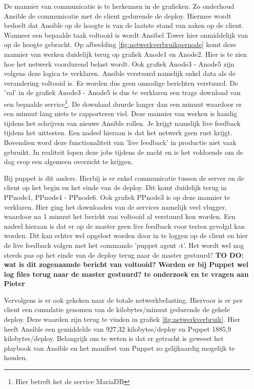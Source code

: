 De mannier van communicatie is te herkennen in de grafieken. Zo onderhoud Ansible de communicatie met de client gedurende de deploy. Hiermee wordt bedoelt dat Ansible op de hoogte is van de laatste stand van zaken op de client. Wanneer een bepaalde taak voltooid is wordt Ansibel Tower hier onmiddelijk van op de hoogte gebracht. Op afbeelding \ref{fig:netwerkverbruikpernode} komt deze mannier van werken duidelijk terug op grafiek Anode1 en Anode2. Hier is te zien hoe het netwerk voordurend belast wordt. Ook grafiek Anode3 - Anode5 zijn volgens deze logica te verklaren. Ansible verstuurd namelijk enkel data als de verandering voltooid is. Er worden dus geen onnodige berichten verstuurd. De 'val' in de grafiek Anode3 - Anode5 is dus te verklaren een trage download van een bepaalde service\footnote{Hier betreft het de service MariaDB}. De download duurde langer dan een minuut waardoor er een minuut lang niets te rapporteren viel. Deze mannier van werken is handig tijdens het schrijven van nieuwe Ansible rollen. Je krijgt namelijk live feedback tijdens het uittesten. Een nadeel hieraan is dat het netwerk geen rust krijgt. Bovendien word deze functionaliteit van 'live feedback' in productie niet vaak gebruikt. In realiteit lopen deze jobs tijdens de nacht en is het voldoende om de dag erop een algemeen overzicht te krijgen.\newline

Bij puppet is dit anders. Hierbij is er enkel communicatie tussen de server en de client op het begin en het einde van de deploy. Dit komt duidelijk terug in PPnode1, PPnode4 - PPnode6. Ook grafiek PPnode3 is op deze mannier te verklaren. Hier ging het downloaden van de services namelijk veel vlugger, waardoor na 1 minuut het bericht van voltooid al verstuurd kon worden. Een nadeel hieraan is dat er op de master geen live feedback voor testen gevolgd kan worden. Dit kan echter wel opgelost worden door in te loggen op de client en hier de live feedback volgen met het commando 'puppet agent -t'. Het wordt wel nog steeds pas op het einde van de deploy terug naar de master gestuurd?
 \newline
\textbf{TO DO: wat is dit zogenaamde bericht van voltooid? Worden er bij Puppet wel log files terug naar de master gestuurd? te onderzoek en te vragen aan Pieter}

Vervolgens is er ook gekeken naar de totale netwerkbelasting. Hiervoor is er per client een cumulatie genomen van de kilobytes/minuut gedurende de gehele deploy. Deze waarden zijn terug te vinden in grafiek \ref{fig:netwerkverbruik}. Hier heeft Ansible een gemiddelde van 927,32 kilobytes/deploy en Puppet 1885,9 kilobytes/deploy. Belangrijk om te weten is dat er getracht is geweest het playbook van Ansible en het manifest van Puppet zo gelijkaardig mogelijk te houden. 


